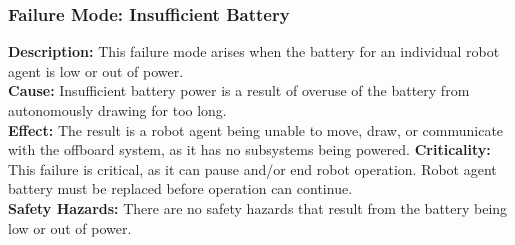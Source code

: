 \subsubsection{Failure Mode: Insufficient Battery}
\label{sec:power_fm_battery}
\textbf{Description:} This failure mode arises when the battery for an individual robot agent is low or out of power.\\
\textbf{Cause:} Insufficient battery power is a result of overuse of the battery from autonomously drawing for too long.\\
\textbf{Effect:} The result is a robot agent being unable to move, draw, or communicate with the offboard system, as it has no subsystems being powered.
\textbf{Criticality:} This failure is critical, as it can pause and/or end robot operation. Robot agent battery must be replaced before operation can continue.\\
\textbf{Safety Hazards:} There are no safety hazards that result from the battery being low or out of power.\\
